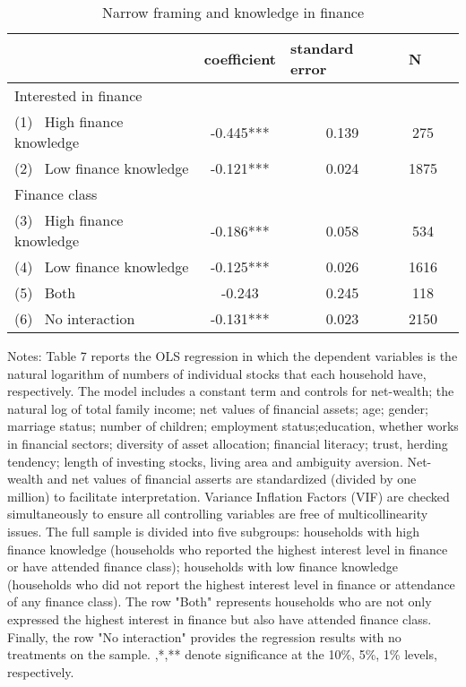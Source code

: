 \documentclass[ukenglish,nottitlepage,thmsb,11pt,letterpaper]{article}
\begin{document}
\begin{table}[H]
	\centering
	\caption{Narrow framing and knowledge in finance}
		\begin{tabular*}{\textwidth}{l @{\extracolsep{\fill}} cccc}
		\toprule
		& \multicolumn{1}{l}{coefficient} & \multicolumn{1}{l}{standard  error} & \multicolumn{1}{l}{N} \\
		\midrule
		Interested in finance &            &            &  \\
		\midrule
		(1) \ High finance knowledge  & -0.445***    & 0.139      & 275 \\
		(2) \ Low finance knowledge & -0.121***    & 0.024      & 1875 \\
		\midrule
		Finance class &            &            &  \\
		\midrule
		(3) \ High finance knowledge & -0.186***    & 0.058      & 534 \\
		(4) \ Low finance knowledge  & -0.125***    & 0.026      & 1616 \\
		\midrule
		(5) \ Both       & -0.243    & 0.245      & 118 \\
		(6) \ No interaction  & -0.131***     & 0.023      & 2150 \\
		\bottomrule
	\end{tabular*}%
	\begin{tablenotes}
	\small
		\item Notes: Table 7 reports the OLS regression in which the dependent variables is the natural logarithm of numbers of individual stocks that each household have, respectively. The model includes a constant term and controls for net-wealth; the natural log of total family income; net values of financial assets; age; gender; marriage status; number of children; employment status;education, whether works in financial sectors; diversity of asset allocation; financial literacy; trust, herding tendency; length of investing stocks, living area and ambiguity aversion. Net-wealth and net values of financial asserts are standardized (divided by one million) to facilitate interpretation. Variance Inflation Factors (VIF) are checked simultaneously to ensure all controlling variables are free of multicollinearity issues. The full sample is divided into five subgroups: households with high finance knowledge (households who reported the highest interest level in finance or have attended finance class); households with low finance knowledge (households who did not report the highest interest level in finance or attendance of any finance class). The row "Both" represents households who are not only expressed the highest interest in finance but also have attended finance class. Finally, the row "No interaction" provides the regression results with no treatments on the sample.  {\tiny*},{\tiny**},{\tiny***} denote significance at the 10\%, 5\%, 1\% levels, respectively.  
    \end{tablenotes}
	\label{tab:addlabel}%
\end{table}%
\end{document}
